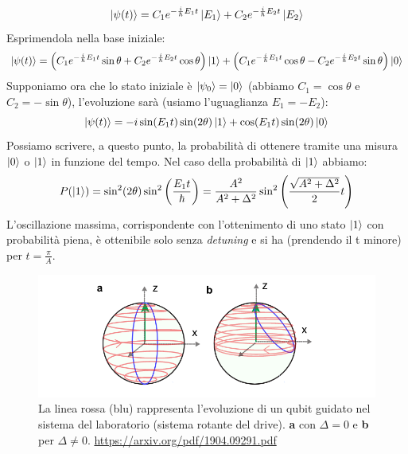 \begin{equation*}
    \ket{\psi (t)} = C_1 e^{-\frac{i}{\hbar} E_1 t}\ket{E_1} + C_2 e^{-\frac{i}{\hbar} E_2 t}\ket{E_2}
\end{equation*}
Esprimendola nella base iniziale:
\begin{equation*}
    \ket{\psi (t)}= \left( C_1 e^{-\frac{i}{\hbar} E_1 t} \sin \theta + C_2 e^{-\frac{i}{\hbar} E_2 t}\cos \theta \right) \ket 1 + \left( C_1 e^{-\frac{i}{\hbar} E_1 t} \cos \theta - C_2 e^{-\frac{i}{\hbar} E_2 t}\sin \theta \right) \ket 0
\end{equation*}
Supponiamo ora che lo stato iniziale è $\ket{\psi_0} = \ket 0$ (abbiamo $C_1=\cos \theta$ e $C_2 =-\sin \theta$), l'evoluzione sarà (usiamo l'uguaglianza $E_1 = -E_2$):
\begin{equation*}
    \ket{\psi(t)}= -i \sin (E_1 t) \sin (2\theta) \ket 1 + \cos (E_1 t) \sin (2 \theta) \ket 0
\end{equation*}
Possiamo scrivere, a questo punto, la probabilità di ottenere tramite una misura $\ket 0$ o $\ket 1$ in funzione del tempo. Nel caso della probabilità di $\ket 1$ abbiamo:
\begin{equation*}
    P(\ket 1) = \sin ^ 2 (2 \theta) \sin ^2 \left( \frac{E_1 t}{\hbar}\right) = \frac{A^2}{A^2 + \Delta^2}\sin ^2 \left( \frac{\sqrt{A^2 + \Delta^2}}{2}t\right)
\end{equation*}
L'oscillazione massima, corrispondente con l'ottenimento di uno stato $\ket 1$ con probabilità piena, è ottenibile solo senza \textit{detuning} e si ha (prendendo il t minore) per $t=\frac{\pi}{A}$.
\begin{figure}[H]
    \centering
    \includegraphics[width=\textwidth]{images/rabi_RWA.png}
    \caption{La linea rossa (blu) rappresenta l'evoluzione di un qubit guidato nel sistema del laboratorio (sistema rotante del drive). \textbf{a} con $\Delta=0$ e \textbf{b} per $\Delta \neq 0$. \url{https://arxiv.org/pdf/1904.09291.pdf}}
    \label{fig:my_label}
\end{figure}

